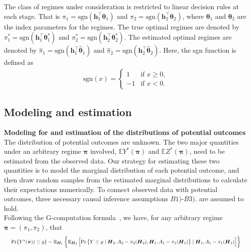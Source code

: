 \documentclass{article}
\newcommand{\wh}{\widehat}
\newcommand{\itl}{\intercal}
\newcommand{\bs}{ \boldsymbol}
\newcommand{\mb}{\mathbb}
\newcommand{\lt}{\left}
\newcommand{\rt}{\right}
\newcommand\indep{\protect\mathpalette{\protect\independenT}{\perp}}
\def\independenT#1#2{\mathrel{\rlap{$#1#2$}\mkern2mu{#1#2}}}
\begin{document}
The class of regimes under consideration is restricted to linear decision rules at each stage. That is $\pi_1 = \text{sgn}(\bs{h}_1^{\itl}\bs{\theta}_1)$ and  $\pi_2 = \text{sgn}(\bs{h}_2^{\itl}\bs{\theta}_2)$, where $\bs{\theta}_1$ and $\bs{\theta}_2$ are the index parameters for the regimes. The true optimal regimes are denoted by $\pi^{*}_1 = \text{sgn}(\bs{h}_1^{\itl}\bs{\theta}^{*}_1)$ and  $\pi^{*}_2 = \text{sgn}(\bs{h}_2^{\itl}\bs{\theta}^{*}_2)$. The estimated optimal regimes are denoted by $\wh{\pi}_1 = \text{sgn}(\bs{h}_1^{\itl}\wh{\bs{\theta}}_1)$ and  $\wh{\pi}_2 = \text{sgn}(\bs{h}_2^{\itl}\wh{\bs{\theta}}_2)$. Here, the sgn function is defined as
 \begin{gather*}
\text{sgn}(x)=\begin{cases}
1 & \mbox{if }x\ge0,\\
-1 & \mbox{if }x<0.
\end{cases}
\end{gather*}
\subsection{Modeling and estimation}
\textbf{Modeling for and estimation of the distributions of potential outcomes}\\
The distribution of potential outcomes are unknown. The two major quantities under an arbitrary regime $\bs{\pi}$ involved, $\mb{E}Y^*(\bs{\pi})$ and $\mb{E}Z^*(\bs{\pi})$, need to be estimated from the observed data. Our strategy for estimating these two quantities is to model the marginal distribution of each potential outcome, and then draw random samples from the estimated marginal distributions to calculate their expectations numerically. To connect observed data with potential outcomes, three necessary causal inference assumptions $\textit{B1)-B3).}$ are assumed to hold. \\

Following the G-computation formula~\cite{Gill2001}, we have, for any arbitrary regime $\bs{\pi} = (\pi_1, \pi_2) $, that
\begin{equation*}	
\resizebox{\textwidth}{!}{
$\text{Pr}\{ Y^*(\bs{\pi})) \le y\} = \mb{E}_{\bs{H}_1} \lt\{ \mb{E}_{\bs{H}_2}\lt[ \text{Pr}\lt\{Y \le y \mid \bs{H}_2 , A_2 = \pi_2(\bs{H}_2), \bs{H}_1 , A_1 = \pi_1(\bs{H}_1)\rt\}  \mid \bs{H}_1, A_1 = \pi_1(\bs{H}_1) \rt] \rt\}$
}
\end{equation*}
\end{document}
